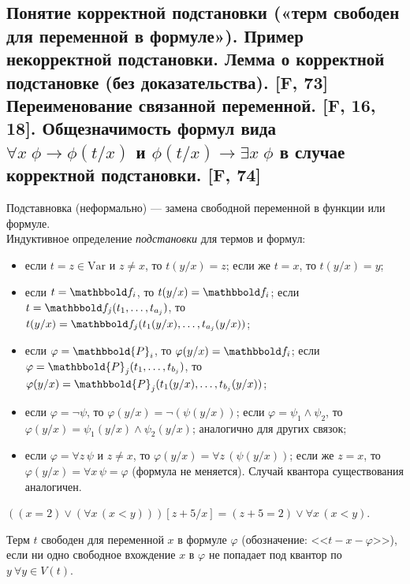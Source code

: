 \documentclass[a4paper, fleqn]{article}
\begin{document}
    \subsection{Понятие корректной подстановки («терм свободен для переменной в формуле»). Пример некорректной подстановки. Лемма о корректной подстановке (без доказательства). [F, 73] Переименование связанной переменной. [F, 16, 18]. Общезначимость формул вида $\forall x \; \phi \to \phi(t/x)$ и $\phi(t/x) \to \exists x \; \phi$ в случае корректной подстановки. [F, 74]}
    
    Подставновка (неформально) --- замена свободной переменной в функции или формуле.\\[-10 pt]
    
        Индуктивное определение \textit{подстановки} для термов и формул:\\[-25 pt]
        \begin{itemize}
            \item если $t = z \in \text{Var}$ и $z \ne x$, то $t(y/x) = z$; если же $t = x$, то $t(y/x) = y$;
            \item если $t = \F_i$, то $t(y/x) = \F_i$; если $t = \F_j(t_1, \ldots, t_{a_j})$, то $t(y/x) = \F_j(t_1(y/x), \ldots, t_{a_j}(y/x))$;
            \item если $\varphi = \mathbbold{P}_i$, то $\varphi(y/x) = \F_i$; если $\varphi = \mathbbold{P}_j(t_1, \ldots, t_{b_j})$, то $\varphi(y/x) = \mathbbold{P}_j(t_1(y/x), \ldots, t_{b_j}(y/x))$;
            \item если $\varphi = \neg\psi$, то $\varphi(y/x) = \neg(\psi(y/x))$; если $\varphi = \psi_1 \wedge \psi_2$, то $\varphi(y/x) = \psi_1(y/x) \wedge \psi_2(y/x)$; аналогично для других связок;
            \item если $\varphi = \forall z\, \psi$ и $z \ne x$, то $\varphi(y/x) = \forall z\, (\psi(y/x))$; если же $z = x$, то $\varphi(y/x) = \forall x\, \psi = \varphi$ (формула не меняется). Случай квантора существования аналогичен.
        \end{itemize}
    
    \begin{example} $((x = 2) \vee (\forall x\, (x < y)))[z+5/x] = (z+5 = 2) \vee \forall x\, (x < y)$. \end{example}
    
    Терм $t$ свободен для переменной $x$ в формуле $\varphi$ (обозначение: <<$t-x-\varphi$>>), если ни одно свободное вхождение $x$ в $\varphi$ не попадает под квантор по $y \: \forall y \in V(t)$.
    
\end{document}
